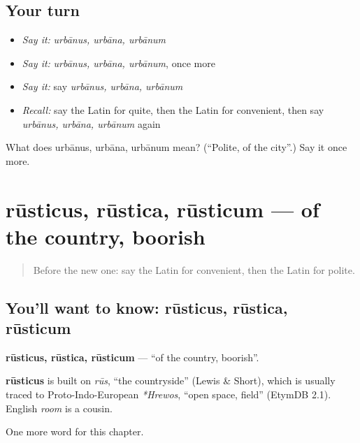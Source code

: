 \subsection*{Your turn}
\begin{itemize}
\raggedright
  \item \emph{Say it:} \emph{urbānus, urbāna, urbānum}
  \item \emph{Say it:} \emph{urbānus, urbāna, urbānum}, once more
  \item \emph{Say it:} say \emph{urbānus, urbāna, urbānum}
  \item \emph{Recall:} say the Latin for quite, then the Latin for convenient, then say \emph{urbānus, urbāna, urbānum} again
\end{itemize}

\begin{tcolorbox}[breakable,colback=teal!4,colframe=teal!35!black,title={Before you move on}]
What does urbānus, urbāna, urbānum mean? (\textquotedblleft{}Polite, of the city\textquotedblright{}.) Say it once more.
\end{tcolorbox}
\section[rūsticus, rūstica, rūsticum]{rūsticus, rūstica, rūsticum — of the country, boorish}

\label{lesson:LA-C180-rusticus}



\begin{quote}
Before the new one: say the Latin for convenient, then the Latin for polite.
\end{quote}

\subsection*{You'll want to know: rūsticus, rūstica, rūsticum}
\textbf{rūsticus, rūstica, rūsticum} — \textquotedblleft{}of the country, boorish\textquotedblright{}.

\begin{cousinweb}
\textbf{rūsticus} is built on \emph{rūs}, \textquotedblleft{}the countryside\textquotedblright{} (Lewis \& Short), which is usually traced to Proto-Indo-European \emph{*Hrewos}, \textquotedblleft{}open space, field\textquotedblright{} (EtymDB 2.1). English \emph{room} is a cousin.
\end{cousinweb}

\begin{grammarlens}[title={What you've built}]
One more word for this chapter.
\end{grammarlens}

